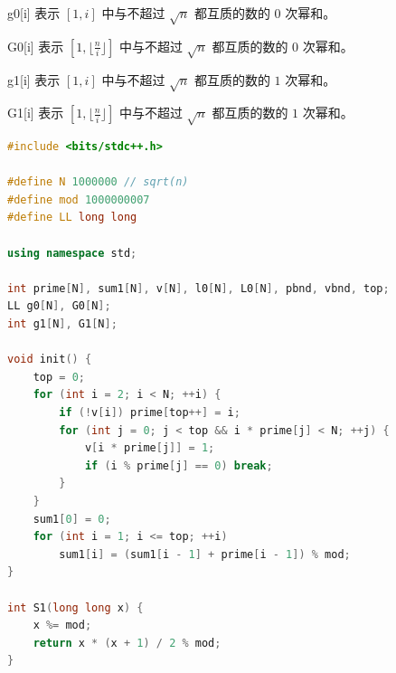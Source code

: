 \documentclass{article}
\begin{document}
g0[i] 表示 $[1, i]$ 中与不超过 $\sqrt{n}$ 都互质的数的 $0$ 次幂和。

G0[i] 表示 $[1, \lfloor \frac{n}{i} \rfloor ]$ 中与不超过 $\sqrt{n}$ 都互质的数的 $0$ 次幂和。

g1[i] 表示 $[1, i]$ 中与不超过 $\sqrt{n}$ 都互质的数的 $1$ 次幂和。

G1[i] 表示 $[1, \lfloor \frac{n}{i} \rfloor ]$ 中与不超过 $\sqrt{n}$ 都互质的数的 $1$ 次幂和。

\begin{lstlisting}[language=C++]
#include <bits/stdc++.h>

#define N 1000000 // sqrt(n)
#define mod 1000000007
#define LL long long

using namespace std;

int prime[N], sum1[N], v[N], l0[N], L0[N], pbnd, vbnd, top;
LL g0[N], G0[N];
int g1[N], G1[N];

void init() {
	top = 0;
	for (int i = 2; i < N; ++i) {
		if (!v[i]) prime[top++] = i;
		for (int j = 0; j < top && i * prime[j] < N; ++j) {
			v[i * prime[j]] = 1;
			if (i % prime[j] == 0) break;
		}
	}
	sum1[0] = 0;
	for (int i = 1; i <= top; ++i)
		sum1[i] = (sum1[i - 1] + prime[i - 1]) % mod;
}

int S1(long long x) {
	x %= mod;
	return x * (x + 1) / 2 % mod;
}


\end{lstlisting}
\end{document}
